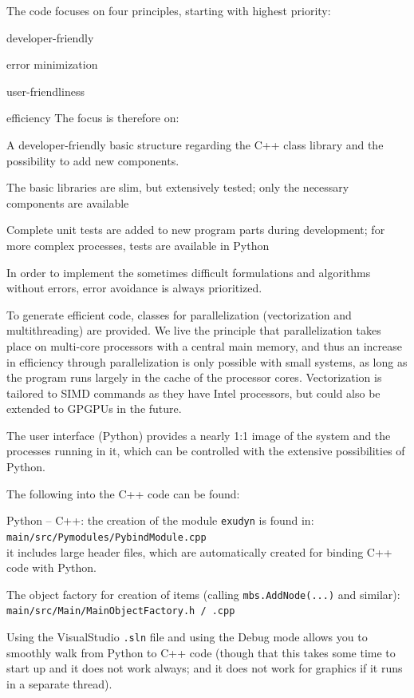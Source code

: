 The code focuses on four principles, starting with highest priority: 
\bn
  \item developer-friendly
  \item error minimization
  \item user-friendliness
  \item efficiency
\en
The focus is therefore on:
\bi
    \item A developer-friendly basic structure regarding the C++ class library and the possibility to add new components.
    \item The basic libraries are slim, but extensively tested; only the necessary components are available
    \item Complete unit tests are added to new program parts during development; for more complex processes, tests are available in Python
    \item In order to implement the sometimes difficult formulations and algorithms without errors, error avoidance is always prioritized.
    \item To generate efficient code, classes for parallelization (vectorization and multithreading) are provided. We live the principle that parallelization takes place on multi-core processors with a central main memory, and thus an increase in efficiency through parallelization is only possible with small systems, as long as the program runs largely in the cache of the processor cores. Vectorization is tailored to SIMD commands as they have Intel processors, but could also be extended to GPGPUs in the future.
    \item The user interface (Python) provides a nearly 1:1 image of the system and the processes running in it, which can be controlled with the extensive possibilities of Python.
\ei

%
The following  into the C++ code can be found:
\bi
  \item Python -- C++: the creation of the module \texttt{exudyn} is found in:\\
    \texttt{main/src/Pymodules/PybindModule.cpp}\\
  it includes large header files, which are automatically created for binding C++ code with Python.
  \item The object factory for creation of items (calling \texttt{mbs.AddNode(...)} and similar): \\
    \texttt{main/src/Main/MainObjectFactory.h / .cpp}
  \item Using the VisualStudio \texttt{.sln} file and using the Debug mode allows you to smoothly walk from Python to C++ code (though that this takes 
  some time to start up and it does not work always; and it does not work for graphics if it runs in a separate thread).
\ei


